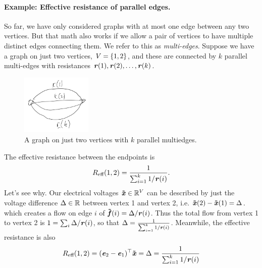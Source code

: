\paragraph{Example: Effective resistance of parallel edges.}
So far, we have only considered graphs with at most one edge between
any two vertices. But that math also works if we allow a pair of
vertices to have multiple distinct edges connecting them. We refer to
this as \emph{multi-edges}.
Suppose we have a graph on just two vertices, $V = \left\{1,2 \right\}$, and
these are connected by $k$ parallel multi-edges with resistances
$\boldsymbol{\mathit{r}}(1), \boldsymbol{\mathit{r}}(2), \ldots, \boldsymbol{\mathit{r}}(k)$.
\begin{figure}[H]
  \centering
  \includegraphics[width=0.3\textwidth]{fig/lecture6_parallelres.jpeg}
  \caption{A graph on just two vertices with $k$ parallel multiedges.}
\label{fig:parallelres}
\end{figure}
The effective resistance between the endpoints is
\[
  R_{\text{eff}}(1,2) =
  \frac{1}{\sum_{i = 1}^k 1/\boldsymbol{\mathit{r}}(i)}
  .
\]
Let's see why.
Our electrical voltages $\boldsymbol{\tilde{\mathit{x}}} \in \mathbb{R}^V$ can be described by just the voltage
difference $\Delta \in \mathbb{R}$ between vertex 1 and vertex 2, i.e. $\boldsymbol{\tilde{\mathit{x}}}(2)
- \boldsymbol{\tilde{\mathit{x}}}(1) = \Delta$.
which creates a flow on edge $i$ of $\boldsymbol{\tilde{\mathit{f}}}(i) = \Delta/\boldsymbol{\mathit{r}}(i)$.
Thus the total flow from vertex 1 to vertex 2 is
$1 = \sum_{i} \Delta/\boldsymbol{\mathit{r}}(i)$,
so that $\Delta =\frac{1}{\sum_{i = 1}^k 1/\boldsymbol{\mathit{r}}(i)}$.
Meanwhile, the effective resistance is also
\[
R_{\text{eff}}(1,2) = (\boldsymbol{\mathit{e}}_{2}-\boldsymbol{\mathit{e}}_{1})^{\top}\boldsymbol{\tilde{\mathit{x}}} = \Delta =\frac{1}{\sum_{i = 1}^k 1/\boldsymbol{\mathit{r}}(i)}
  \]
